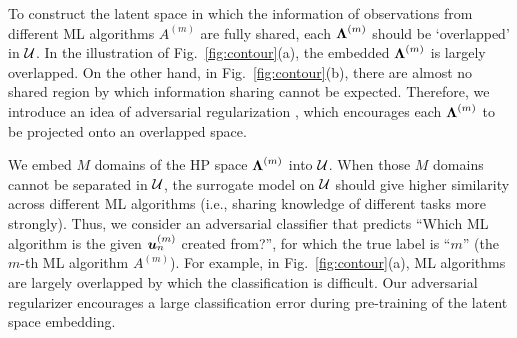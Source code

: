 To construct the latent space in which the information of observations from different ML algorithms $A^{(m)}$ are fully shared, each $\boldsymbol{\Lambda}^{(m)}$ should be `overlapped' in ${\mathcal U}$.
%
In the illustration of Fig.~\ref{fig:contour}(a), the embedded $\boldsymbol{\Lambda}^{(m)}$ is largely overlapped.
%
On the other hand, in Fig.~\ref{fig:contour}(b), there are almost no shared region by which information sharing cannot be expected.
%
%
%
Therefore, we introduce an idea of adversarial regularization \cite{ganin2016domain,zhao2018adversarial}, which encourages each $\boldsymbol{\Lambda}^{(m)}$ to be projected onto an overlapped space.


We embed $M$ domains of the HP space $\boldsymbol{\Lambda}^{(m)}$ into ${\mathcal U}$.
%
When those $M$ domains cannot be separated in ${\mathcal U}$, the surrogate model on ${\mathcal U}$ should give higher similarity across different ML algorithms (i.e., sharing knowledge of different tasks more strongly).
%
Thus, we consider an adversarial classifier that predicts ``Which ML algorithm is the given $\boldsymbol{u}_n^{(m)}$ created from?'', for which the true label is ``$m$'' (the $m$-th ML algorithm $A^{(m)}$).
%
For example, in Fig.~\ref{fig:contour}(a), ML algorithms are largely overlapped by which the classification is difficult.
%
Our adversarial regularizer encourages a large classification error during pre-training of the latent space embedding.


